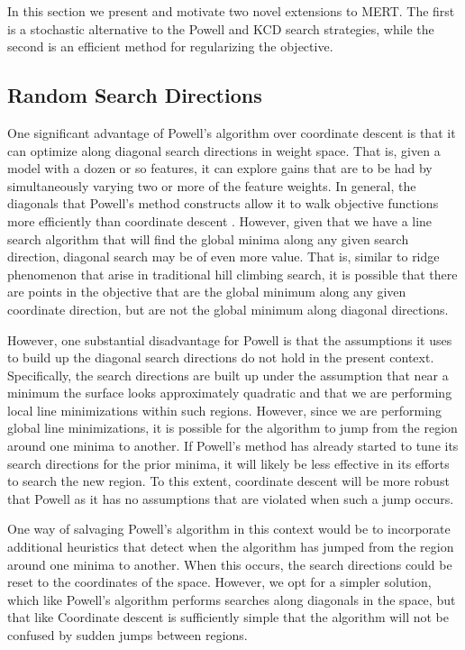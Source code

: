 \documentclass[11pt]{article}
\begin{document}
In this section we present and motivate two novel extensions to MERT. The first is a stochastic alternative to the Powell and KCD search strategies, while the second is an efficient method for regularizing the objective.

\subsection{Random Search Directions}

One significant advantage of Powell's algorithm over coordinate descent is that it can optimize along diagonal search directions in weight space. That is, given a model with a dozen or so features, it can explore gains that are to be had by simultaneously varying two or more of the feature weights. In general, the diagonals that Powell's method constructs allow it to walk objective functions more efficiently than coordinate descent \cite{press2007}. However, given that we have a line search algorithm that will find the global minima along any given search direction, diagonal search may be of even more value. That is, similar to ridge phenomenon that arise in traditional hill climbing search, it is possible that there are points in the objective that are the global minimum along any given coordinate direction, but are not the global minimum along diagonal directions.  

However, one substantial disadvantage for Powell is that the assumptions it uses to build up the diagonal search directions do not hold in the present context. Specifically, the search directions are built up under the assumption that near a minimum the surface looks approximately quadratic and that we are performing local line minimizations within such regions. However, since we are performing global line minimizations, it is possible for the algorithm to jump from the region around one minima to another. If Powell's method has already started to tune its search directions for the prior minima, it will likely be less effective in its efforts to search the new region. To this extent, coordinate descent will be more robust that Powell as it has no assumptions that are violated when such a jump occurs. 

One way of salvaging Powell's algorithm in this context would be to incorporate additional heuristics that detect when the algorithm has jumped from the region around one minima to another. When this occurs, the search directions could be reset to the coordinates of the space. However, we opt for a simpler solution, which like Powell's algorithm performs searches along diagonals in the space, but that like Coordinate descent is sufficiently simple that the algorithm will not be confused by sudden jumps between regions. 
\end{document}
